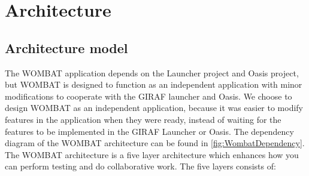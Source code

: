 \section{Architecture}
\label{sec:Architecture}

\subsection{Architecture model}
The WOMBAT application depends on the Launcher project and Oasis project, but WOMBAT is designed to function as an independent application with minor modifications to cooperate with the GIRAF launcher and Oasis.
We choose to design WOMBAT as an independent application, because it was easier to modify features in the application when they were ready, instead of waiting for the features to be implemented in the GIRAF Launcher or Oasis. 
The dependency diagram of the WOMBAT architecture can be found in \autoref{fig:WombatDependency}.
The WOMBAT architecture is a five layer architecture which enhances how you can perform testing and do collaborative work. 
The five layers consists of: 

